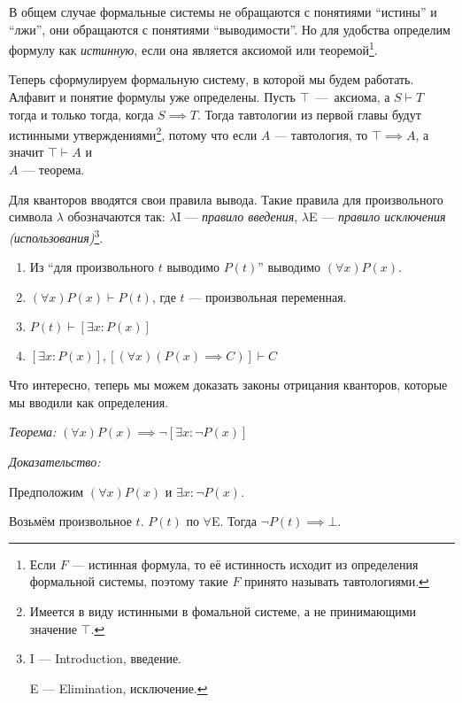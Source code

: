 В общем случае формальные системы не обращаются с понятиями ``истины'' и ``лжи'',
они обращаются с понятиями ``выводимости''. Но для удобства определим формулу
как {\it истинную}, если она является аксиомой или теоремой\footnote{
	Если $F$ --- истинная формула, то её истинность исходит из
	определения формальной системы, поэтому такие $F$ принято называть тавтологиями.
}.

Теперь сформулируем формальную систему, в которой мы будем работать.
Алфавит и понятие формулы уже определены. Пусть $\top$~---~аксиома,
а $S\vdash T$ тогда и только тогда, когда ${S\implies T}$.
Тогда тавтологии из первой главы будут истинными
утверждениями\footnote{Имеется в виду истинными в фомальной системе,
	а не принимающими значение $\top$.}, потому что если $A$ --- тавтология,
то ${\top\implies A}$, а значит $\top\vdash A$ и\\
$A$ --- теорема.

\pagebreak

Для кванторов вводятся свои правила вывода. Такие правила для произвольного
символа $\lambda$ обозначаются так: $\lambda$I --- {\it правило
введения}, $\lambda$E --- {\it правило исключения (использования)}\footnote{
	I --- Introduction, введение.

	E --- Elimination, исключение.
}.

\newcommand\Aii{$\forall$I}
\newcommand\Aee{$\forall$E}
\newcommand\Eii{$\exists$I}
\newcommand\Eee{$\exists$E}
\begin{enumerate}
	\item[(\Aii)]{}Из ``для произвольного $t$ выводимо $P(t)$''
	выводимо $(\forall x)P(x)$.
	\item[(\Aee)]{}$(\forall x)P(x)\vdash P(t)$, где $t$ --- произвольная переменная.
	\item[(\Eii)]{}$P(t)\vdash [\exists x:P(x)]$
	\item[(\Eee)]{}$[\exists x:P(x)], [(\forall x)(P(x)\implies C)]\vdash C$
\end{enumerate}

Что интересно, теперь мы можем доказать законы отрицания кванторов,
которые мы вводили как определения.

\label{wordproof}
{\it Теорема:}
$(\forall x)P(x)\implies \lnot[\exists x:\lnot P(x)]$

{\it Доказательство:}

Предположим $(\forall x)P(x)$ и $\exists x:\lnot P(x)$.

Возьмём произвольное $t$. $P(t)$ по \Aee. Тогда $\lnot P(t)\implies\bot$.

